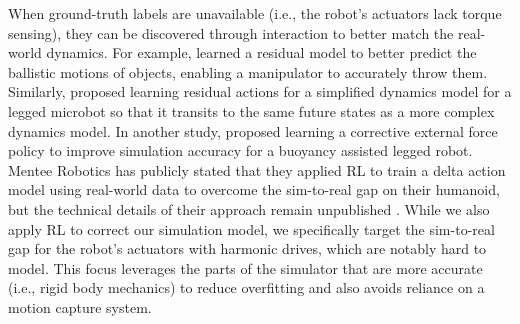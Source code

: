 When ground-truth labels are unavailable (i.e., the robot's actuators lack torque sensing), 
they can be discovered through interaction
to better match the real-world dynamics.
For example, \citet{zeng2020tossingbot} learned a residual model to better predict the ballistic motions of objects, enabling a manipulator to accurately throw them.
Similarly, \citet{gruenstein2021residualmodellearningmicrorobot} proposed learning residual actions for a simplified dynamics model for a legged microbot so that it transits to the same future states as a more complex dynamics model. In another study, \citet{sontakke2023residual} proposed learning a corrective external force policy to improve simulation accuracy for a buoyancy assisted legged robot.
Mentee Robotics has publicly stated that they applied RL to train a delta action model using real-world data
to overcome the sim-to-real gap on their humanoid, 
but the technical details of their approach remain unpublished
\cite{Mentee_Robotics_2024}. While we also apply RL to correct our simulation model, we specifically target the sim-to-real gap for the robot's actuators with harmonic drives, which are notably hard to model. This focus leverages the parts of the simulator that are more accurate (i.e., rigid body mechanics) to reduce overfitting and also avoids reliance on a motion capture system.